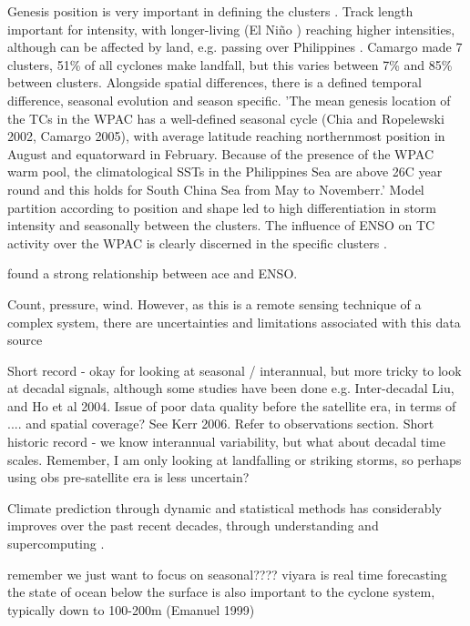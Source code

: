 Genesis position is very important in defining the clusters \citep{CamargoRobertsonGaffneyEtAl2007}
. Track length important for intensity, with longer-living  (El Ni\~{n}o ) reaching higher intensities, although can be affected by land, e.g. passing over Philippines \citep{CamargoRobertsonGaffneyEtAl2007}. Camargo made 7 clusters, 51\% of all cyclones make landfall, but this varies between 7\% and 85\% between clusters. Alongside spatial differences, there is a defined temporal difference, seasonal evolution and season specific. 'The mean genesis location of the TCs in the WPAC has a well-defined seasonal cycle (Chia and Ropelewski 2002, Camargo 2005), with average latitude reaching northernmost position in August and equatorward in February. Because of the presence of the WPAC warm pool, the climatological SSTs in the Philippines Sea are above 26C year round and this holds for South China Sea from May to Novemberr.' Model partition according to position and shape led to high differentiation in storm intensity and seasonally between the clusters. The influence of ENSO on TC activity over the WPAC is clearly discerned in the specific clusters \citep{camargo2007cluster}.

\cite{camargo2007cluster} found a strong relationship between ace and ENSO.


Count, pressure, wind. 
However, as this is a remote sensing technique of a complex system, there are uncertainties and limitations associated with this data source

Short record - okay for looking at seasonal / interannual, but more tricky to look at decadal signals, although some studies have been done e.g.\citep{liu2008interdecadal} Inter-decadal Liu, and Ho et al 2004.
Issue of poor data quality before the satellite era, in terms of .... and spatial coverage? See Kerr 2006. Refer to observations section. 
Short historic record - we know interannual variability, but what about decadal time scales.                          Remember, I am only looking at landfalling or striking storms, so perhaps using obs pre-satellite era is less uncertain?


Climate prediction through dynamic and statistical methods has considerably improves over the past recent decades, through understanding and supercomputing \citep{zhan2012seasonal}.

remember we just want to focus on seasonal???? viyara is real time forecasting\\

the state of ocean below the surface is also important to the cyclone system, typically down to 100-200m (Emanuel 1999) 

